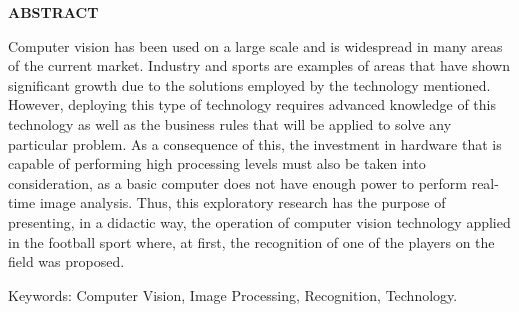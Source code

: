 \begin{center}
\textbf{ABSTRACT}
\end{center}

$\!$\\
\noindent
Computer vision has been used on a large scale and is widespread in many areas of the current market. Industry and sports are examples of areas that have shown significant growth due to the solutions employed by the technology mentioned. However, deploying this type of technology requires advanced knowledge of this technology as well as the business rules that will be applied to solve any particular problem. As a consequence of this, the investment in hardware that is capable of performing high processing levels must also be taken into consideration, as a basic computer does not have enough power to perform real-time image analysis. Thus, this exploratory research has the purpose of presenting, in a didactic way, the operation of computer vision technology applied in the football sport where, at first, the recognition of one of the players on the field was proposed.

\vspace{1cm}

\hspace{0cm}Keywords: Computer Vision, Image Processing, Recognition, Technology.